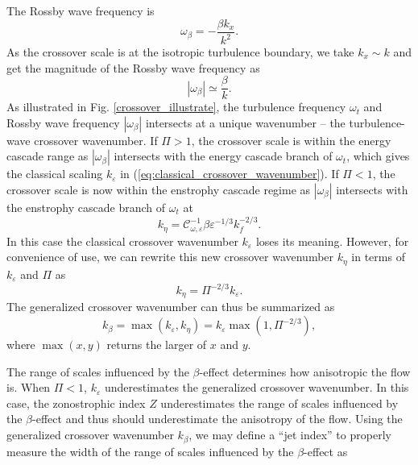 \documentclass{ametsoc}
\begin{document}
The Rossby wave frequency is 
\begin{equation}
\omega_{\beta}=-\frac{\beta k_{x}}{k^{2}}.\label{eq:Rossby_wave_freq_kx_k}
\end{equation}
As the crossover scale is at the isotropic turbulence boundary, we
take $k_{x}\sim k$ and get the magnitude of the Rossby wave frequency as
\begin{equation}
|\omega_{\beta}|\simeq\frac{\beta}{k}.\label{eq:Rossby_wave_freq_k}
\end{equation}
As illustrated in Fig. \ref{crossover_illustrate}, the turbulence frequency
$\omega_{t}$ and Rossby wave frequency $|\omega_{\beta}|$ intersects at a
unique wavenumber -- the turbulence-wave crossover wavenumber.
If $\Pi>1$, the crossover scale is within the energy cascade range as
$|\omega_\beta|$ intersects with the energy cascade branch of $\omega_t$,
which gives the classical scaling $k_\varepsilon$ in (\ref{eq:classical_crossover_wavenumber}).
If $\Pi<1$, the crossover scale is now within the enstrophy cascade regime
as $|\omega_\beta|$ intersects with the enstrophy cascade branch of $\omega_t$
at 
\begin{equation}
k_{\eta}=\mathcal{C}_{\omega,\varepsilon}^{-1}\beta\varepsilon^{-1/3}k_{f}^{-2/3}.\label{eq:crossover_k_enstrophy_branch}
\end{equation}
In this case the classical crossover wavenumber $k_\varepsilon$ loses its meaning.
However, for convenience of use, we can rewrite this new crossover wavenumber $k_\eta$
in terms of $k_\varepsilon$ and $\Pi$ as
\begin{equation}
k_{\eta}=\Pi^{-2/3}k_{\varepsilon}.\label{eq:k_eta_k_epsilon_relation}
\end{equation}
The generalized crossover wavenumber can thus be summarized as
\begin{equation}
k_{\beta}=\max(k_{\varepsilon},k_{\eta})=k_{\varepsilon}\max(1,\Pi^{-2/3}),\label{eq:generalized_crossover_wavenumber}
\end{equation}
where $\max(x,y)$ returns the larger of $x$ and $y$. 

The range of scales influenced by the $\beta$-effect determines
how anisotropic the flow is. When $\Pi<1$, 
$k_{\varepsilon}$ underestimates the generalized crossover wavenumber.
In this case, the zonostrophic index $Z$ underestimates the range
of scales influenced by the $\beta$-effect and thus should underestimate the anisotropy
of the flow. Using the generalized crossover wavenumber $k_{\beta}$,
we may define a ``jet index'' to properly measure the width of the
range of scales influenced by the $\beta$-effect as
\end{document}
